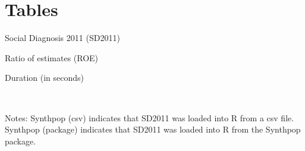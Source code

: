 \section{Tables}

\vskip -5mm
\begin{table}[!htb]
\minipage{\textwidth}
    \caption{Social Diagnosis 2011 (SD2011)}
    \centering
    \resizebox{\textwidth}{!}{}
    \label{table:sd2011_data_structure}
\endminipage

\vskip 5mm
\minipage{\textwidth}
    \caption{Ratio of estimates (ROE)}
    \centering
    \resizebox{.5\textwidth}{!}{}
    \label{table:table_compare_roe}
\endminipage

\vskip 5mm
\minipage{\textwidth}
    \centering
    \caption{Duration (in seconds)}
    \resizebox{\textwidth}{!}{}
    \label{table:table_sd2011_duration}
    \\
    \raggedright
    \tiny{Notes: Synthpop (csv) indicates that SD2011 was loaded into R from a csv file.  Synthpop (package) indicates that SD2011 was loaded into R from the Synthpop package.}
\endminipage
\end{table}